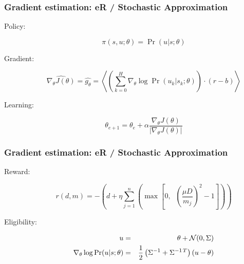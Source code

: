 \documentclass{beamer}
\begin{document}
\begin{frame}[label=appendixeR]
  \frametitle{Gradient estimation: eR / Stochastic Approximation}
  \begin{description}
  \item[Policy:]
    \[
    \pi(s,u;\theta) = \Pr(u|s;\theta)
    \]
  \item[Gradient:]
    \[
    \widehat{\nabla_\theta J(\theta)} = \widehat{g_\theta} = \left< \left( \sum_{k=0}^H
    \nabla_\theta \log\Pr(u_k|s_k;\theta)\right) \cdot (r-b)\right>
    \]
  \item[Learning:]
    \[
    \theta_{e+1} = \theta_e+\alpha\frac{\nabla_\theta
      J(\theta)}{\left|\nabla_\theta J(\theta)\right|}
    \]
  \end{description}
\end{frame}

\begin{frame}
  \frametitle{Gradient estimation: eR / Stochastic Approximation}%
  \begin{description}
  \item[Reward:]
    \[
    r(d,m)=-\left(d+\eta\sum_{j=1}^n\left(\max\left[0,\;\;\left(\frac{\mu D}{m_j}\right)^2-1\right]\right)\right)
    \]
  \item[Eligibility:]
    \begin{eqnarray*}
      u &=& \theta + {\cal N}(0, \Sigma)\\
      \nabla_\theta\log\Pr(u|s;\theta) &=& \frac{1}{2}\left(
      \Sigma^{-1}+\Sigma^{-1\,T} \right) \left( u - \theta \right)
    \end{eqnarray*}
  \end{description}
\end{frame}
\end{document}
